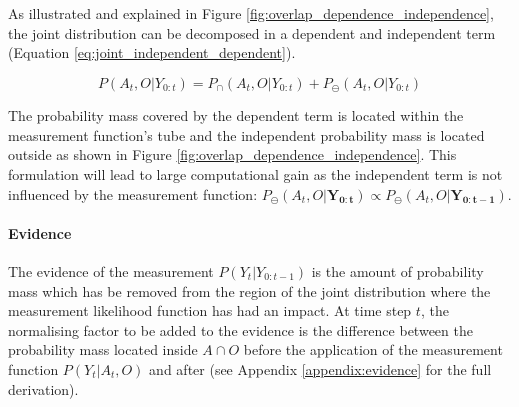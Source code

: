 \documentclass[review]{elsarticle}
\numberwithin{equation}{section}
\begin{document}
As illustrated and explained in Figure \ref{fig:overlap_dependence_independence}, the joint distribution can be decomposed in a 
dependent and independent term (Equation \ref{eq:joint_independent_dependent}). 

\begin{equation}\label{eq:joint_independent_dependent}
 P(A_t,O|Y_{0:t}) = P_{\cap}(A_t,O|Y_{0:t}) + P_{\ominus}(A_t,O|Y_{0:t})
\end{equation}

The probability mass covered by the dependent term is located within the measurement function's tube and the independent probability mass 
is located outside as shown in Figure \ref{fig:overlap_dependence_independence}. This formulation will lead to large computational gain 
as the independent term is not influenced by the measurement function: $P_{\ominus}(A_t,O|\mathbf{Y_{0:t}}) \propto P_{\ominus}(A_t,O|\mathbf{Y_{0:t-1}})$.

\paragraph{Evidence}
The evidence of the measurement $P(Y_t|Y_{0:t-1})$ is the amount of probability mass which has be removed from the region of the joint 
distribution where the measurement likelihood function has had an impact. At time step $t$, the normalising factor to be added to 
the evidence is the difference between the probability mass located inside $A\cap O$ before the application of the measurement 
function $P(Y_t|A_t,O)$ and after (see Appendix \ref{appendix:evidence} for the full derivation).
\end{document}
